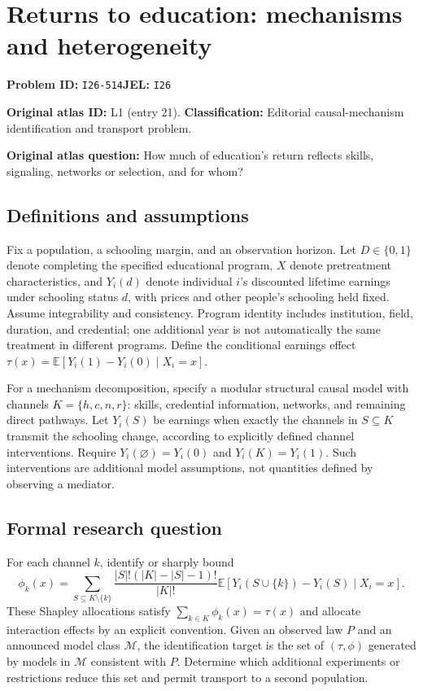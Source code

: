 \documentclass[11pt,a4paper]{article}
\begin{document}
\section*{Returns to education: mechanisms and heterogeneity}
\textbf{Problem ID:} \texttt{I26-514}\quad \textbf{JEL:} \texttt{I26}\par
\label{problem:OP-0021}
\label{atlas:prob:L1}
\noindent\textbf{Original atlas ID:} L1 (entry 21). \textbf{Classification:} Editorial causal-mechanism identification and transport problem.

\noindent\textbf{Original atlas question:} How much of education’s return reflects skills, signaling, networks or selection, and for whom?

\subsection*{Definitions and assumptions}
Fix a population, a schooling margin, and an observation horizon. Let $D\in\{0,1\}$ denote completing the specified educational program, $X$ denote pretreatment characteristics, and $Y_i(d)$ denote individual $i$'s discounted lifetime earnings under schooling status $d$, with prices and other people's schooling held fixed. Assume integrability and consistency. Program identity includes institution, field, duration, and credential; one additional year is not automatically the same treatment in different programs. Define the conditional earnings effect $\tau(x)=\mathbb E[Y_i(1)-Y_i(0)\mid X_i=x]$.

For a mechanism decomposition, specify a modular structural causal model with channels $K=\{h,c,n,r\}$: skills, credential information, networks, and remaining direct pathways. Let $Y_i(S)$ be earnings when exactly the channels in $S\subseteq K$ transmit the schooling change, according to explicitly defined channel interventions. Require $Y_i(\varnothing)=Y_i(0)$ and $Y_i(K)=Y_i(1)$. Such interventions are additional model assumptions, not quantities defined by observing a mediator.
\subsection*{Formal research question}
For each channel $k$, identify or sharply bound
\[
 \phi_k(x)=\sum_{S\subseteq K\setminus\{k\}}
 \frac{|S|!(|K|-|S|-1)!}{|K|!}
 \mathbb E[Y_i(S\cup\{k\})-Y_i(S)\mid X_i=x].
\]
These Shapley allocations satisfy $\sum_{k\in K}\phi_k(x)=\tau(x)$ and allocate interaction effects by an explicit convention. Given an observed law $P$ and an announced model class $\mathcal M$, the identification target is the set of $(\tau,\phi)$ generated by models in $\mathcal M$ consistent with $P$. Determine which additional experiments or restrictions reduce this set and permit transport to a second population.
\end{document}
